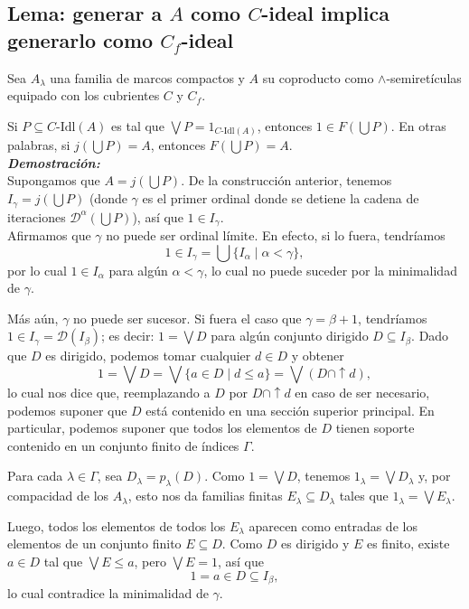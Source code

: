\documentclass[12pt,letterpaper,titlepage]{article}
\theoremstyle{definition}
\newcommand\Sup{\bigvee}
\renewcommand\inf{\wedge}
\newcommand\D{\mathcal D}
\newcommand\tps[1]{\texorpdfstring{#1}{}}
\newcommand\<{\langle}
\renewcommand\>{\rangle}
\newcommand\Idl{\text{-}\mathrm{Idl}}
\begin{document}
\subsection{Lema: generar a \tps{$A$} como \tps{$C$}-ideal implica generarlo como \tps{$C_f$}-ideal}
    Sea $A_\lambda$ una familia de marcos compactos y $A$
    su coproducto como $\inf$-semiretículas equipado con
    los cubrientes $C$ y $C_f$.
    
    Si $P\subseteq C\Idl(A)$ es tal que $\Sup P=1_{C\Idl(A)}$,
    entonces $1\in F(\bigcup P)$.
    En otras palabras, si
    $j(\bigcup P)=A$, entonces $F(\bigcup P)=A$.
    \\
    \textbf{\emph{Demostración:}} \\
    Supongamos que $A=j(\bigcup P)$.
    De la construcción anterior, tenemos
    $I_\gamma=j(\bigcup P)$ (donde $\gamma$ es el primer
    ordinal donde se detiene la cadena de iteraciones
    $\D^\alpha(\bigcup P)$),
    así que $1\in I_\gamma$. \\
    Afirmamos que $\gamma$ no puede ser ordinal límite.
    En efecto, si lo fuera, tendríamos
    \[
        1 \in I_\gamma = \bigcup\{I_\alpha \mid \alpha<\gamma\}
    ,\]
    por lo cual $1\in I_\alpha$ para algún $\alpha<\gamma$, lo
    cual no puede suceder por la minimalidad de $\gamma$.

    Más aún, $\gamma$ no puede ser sucesor.
    Si fuera el caso que $\gamma=\beta+1$, tendríamos
    $1\in I_\gamma = \D(I_\beta)$;
    es decir: $1=\Sup D$ para algún conjunto dirigido
    $D\subseteq I_\beta$.
    Dado que $D$ es dirigido, podemos tomar cualquier
    $d\in D$ y obtener
    \[
        1
        = \Sup D
        = \Sup\{a\in D\mid d\leq a\}
        = \Sup(D\cap{\uparrow}d)
    ,\]
    lo cual nos dice que,
    reemplazando a $D$ por $D\cap{\uparrow}d$ en
    caso de ser necesario,
    podemos suponer que $D$ está contenido en una
    sección superior principal.
    En particular, podemos suponer que todos los elementos
    de $D$ tienen soporte contenido en
    un conjunto finito de índices $\Gamma$.

    Para cada $\lambda\in\Gamma$, sea $D_\lambda=p_\lambda(D)$.
    Como $1=\Sup D$, tenemos $1_\lambda=\Sup D_\lambda$ y,
    por compacidad de los $A_\lambda$, esto nos da familias finitas
    $E_\lambda\subseteq D_\lambda$ tales que
    $1_\lambda=\Sup E_\lambda$.
    
    Luego, todos los elementos de todos los $E_\lambda$ aparecen
    como entradas de los elementos de un conjunto finito
    $E\subseteq D$.
    Como $D$ es dirigido y $E$ es finito,
    existe $a\in D$ tal que $\Sup E\leq a$,
    pero $\Sup E=1$, así que
    \[
        1 = a \in D\subseteq I_\beta
    ,\]
    lo cual contradice la minimalidad de $\gamma$.
    
\end{document}
